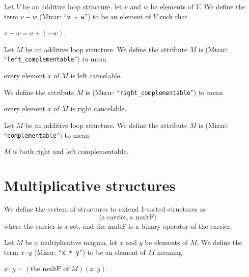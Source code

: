 \documentclass{article}
\begin{document}
\begin{definition}
Let $V$ be an additive loop structure, let $v$ and $w$ be elements of $V$.
We define the term $v-w$ (Mizar: ``\verb#v - w#'') to be an element of $V$
such that
\begin{defn}
\item $v-w=v+(-w)$.
\end{defn}
\end{definition}

\begin{definition}
Let $M$ be an additive loop structure.
We define the attribute $M$ is 
(Mizar: ``\verb#left_complementable#'') to mean
\begin{defn}
\item every element $x$ of $M$ is left cancelable.
\end{defn}
We define the attribute $M$ is 
(Mizar: ``\verb#right_complementable#'') to mean
\begin{defn}
\item every element $x$ of $M$ is right cancelable.
\end{defn}
\end{definition}

\begin{definition}
Let $M$ be an additive loop structure.
We define the attribute $M$ is 
(Mizar: ``\verb#complementable#'') to mean
\begin{defn}
\item $M$ is both right and left complementable.
\end{defn}
\end{definition}

\section{Multiplicative structures}

\begin{definition}
We define the system of  structures to
extend 1-sorted structures as
\[\langle\mbox{a carrier}, \mbox{a multF}\rangle\]
where the carrier is a set, and the multF is a binary operator of the
carrier.
\end{definition}

\begin{definition}
Let $M$ be a multiplicative magma, let $x$ and $y$ be elements of $M$.
We define the term $x\cdot y$ (Mizar: ``\verb#x * y#'')
to be an element of $M$ meaning
\begin{defn}%
\item $x\cdot y=(\mbox{the multF of $M$})(x,y)$.
\end{defn}
\end{definition}
\end{document}
